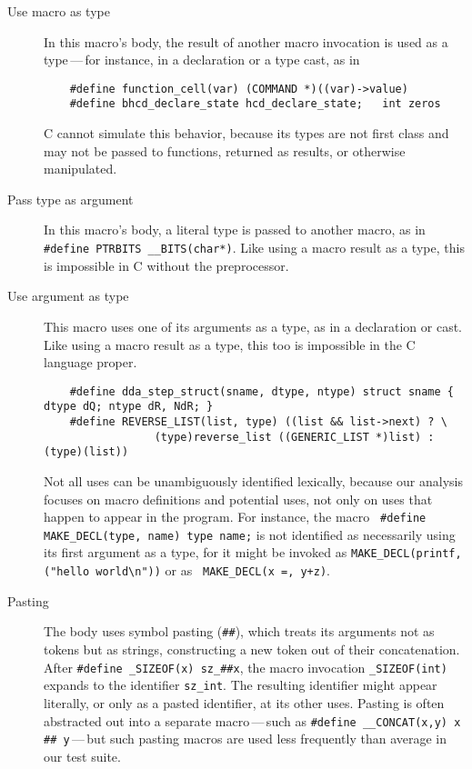 \documentclass[10pt]{article}
\begin{document}
\begin{description}

\item[Use macro as type]
  In this macro's body, the result of another macro invocation is used as a
  type\,---\,for instance, in a declaration or a type cast, as in 
\begin{verbatim}
    #define function_cell(var) (COMMAND *)((var)->value)
    #define bhcd_declare_state hcd_declare_state;   int zeros
\end{verbatim}
  C cannot
  simulate this behavior, because its types are not first class and may not
  be passed to functions, returned as results, or otherwise manipulated.

\item[Pass type as argument]
  In this macro's body, a literal type is passed to another macro, as in
  {\tt \#define PTRBITS \verb|__BITS|(char*)}.  Like using a macro result
  as a type, this is impossible in C without the preprocessor.

\item[Use argument as type]
  This macro uses one of its arguments as a type, as in a declaration or
  cast.  Like using a macro result as a type, this too is impossible in the
  C language proper.
\begin{verbatim}
    #define dda_step_struct(sname, dtype, ntype) struct sname { dtype dQ; ntype dR, NdR; }
    #define REVERSE_LIST(list, type) ((list && list->next) ? \
                 (type)reverse_list ((GENERIC_LIST *)list) : (type)(list))
\end{verbatim}
  Not all uses can be unambiguously identified lexically, because our
  analysis focuses on macro definitions and potential uses, not only on
  uses that happen to appear in the program.  For instance, the macro {\tt
  \#define \verb|MAKE_DECL|(type, name) type name;} is not identified as
  necessarily using its first argument as a type, for it might be invoked as
  {\tt \verb|MAKE_DECL|(printf, ("hello world\verb|\|n"))} or as {\tt
  \verb|MAKE_DECL|(x =, y+z)}.

\item[Pasting]\label{def:pasting}
  The body uses symbol pasting ({\tt \#\#}), which treats its arguments not
  as tokens but as strings, constructing a new token out of their
  concatenation.  After {\tt \#define \verb|_SIZEOF|(x) \verb|sz_|\#\#x},
  the macro invocation {\tt \verb|_SIZEOF|(int)} expands to the 
  identifier {\tt \verb|sz_int|}.  The resulting identifier might appear literally, or
  only as a pasted identifier, at its other uses.  Pasting is often
  abstracted out into a separate macro\,---\,such as {\tt \#define
  \verb|__CONCAT|(x,y) x \#\# y}\,---\,but such pasting macros are used less
  frequently than average in our test suite.


\end{description}
\end{document}
